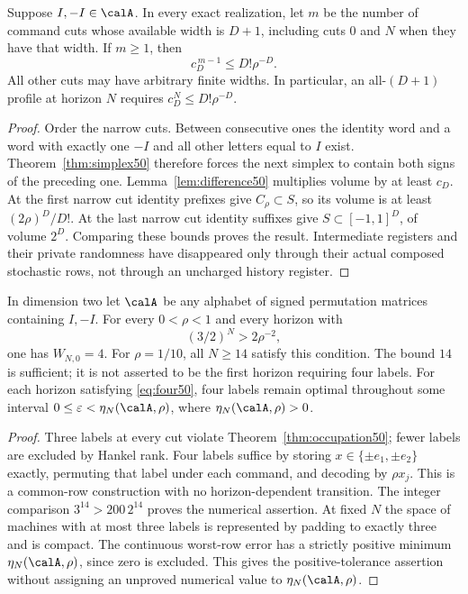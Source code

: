 \begin{theorem}\label{thm:occupation50}
Suppose $I,-I\in\calA$. In every exact realization, let $m$ be the
number of command cuts whose available width is $D+1$, including cuts $0$ and $N$ when they have that width. If $m\ge1$, then
\begin{equation}\label{eq:occupation50}
 c_D^{\,m-1}\le D!\rho^{-D}.
\end{equation}
All other cuts may have arbitrary finite widths. In particular, an
all-$(D+1)$ profile at horizon $N$ requires
$c_D^N\le D!\rho^{-D}$.
\end{theorem}
\begin{proof}
Order the narrow cuts. Between consecutive ones the identity word and
a word with exactly one $-I$ and all other letters equal to $I$ exist. Theorem~\ref{thm:simplex50} therefore
forces the next simplex to contain both signs of the preceding one.
Lemma~\ref{lem:difference50} multiplies volume by at least $c_D$.
At the first narrow cut identity prefixes give $C_\rho\subset S$,
so its volume is at least $(2\rho)^D/D!$. At the last narrow cut
identity suffixes give $S\subset[-1,1]^D$, of volume $2^D$.
Comparing these bounds proves the result. Intermediate registers and
their private randomness have disappeared only through their actual
composed stochastic rows, not through an uncharged history register.
\end{proof}

\begin{corollary}\label{cor:four50}
In dimension two let $\calA$ be any alphabet of signed permutation
matrices containing $I,-I$. For every $0<\rho<1$ and every horizon with
\begin{equation}\label{eq:four50}
 (3/2)^N>2\rho^{-2},
\end{equation}
one has $W_{N,0}=4$. For $\rho=1/10$, all $N\ge14$ satisfy this
condition. The bound $14$ is sufficient; it is not asserted to be the
first horizon requiring four labels. For each horizon satisfying
\eqref{eq:four50}, four labels remain optimal throughout some interval
$0\le\varepsilon<\eta_N(\calA,\rho)$, where $\eta_N(\calA,\rho)>0$.
\end{corollary}
\begin{proof}
Three labels at every cut violate Theorem~\ref{thm:occupation50}; fewer
labels are excluded by Hankel rank. Four labels suffice by storing
$x\in\{\pm e_1,\pm e_2\}$ exactly, permuting that label under each
command, and decoding by $\rho x_j$. This is a common-row construction
with no horizon-dependent transition. The integer comparison
$3^{14}>200\,2^{14}$ proves the numerical assertion. At fixed $N$ the
space of machines with at most three labels is represented by padding
to exactly three and is compact. The continuous worst-row error has a
strictly positive minimum $\eta_N(\calA,\rho)$, since zero is excluded. This gives
the positive-tolerance assertion without assigning an unproved
numerical value to $\eta_N(\calA,\rho)$.
\end{proof}


